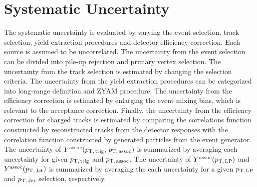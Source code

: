 
\section{Systematic Uncertainty}
\label{sec:uncertainties}
The systematic uncertainty is evaluated by varying the event selection, track selection, yield extraction procedures and detector efficiency correction. Each source is assumed to be uncorrelated. The uncertainty from the event selection can be divided into pile-up rejection and primary vertex selection. The uncertainty from the track selection is estimated by changing the selection criteria. The uncertainty from the yield extraction procedures can be categorized into long-range definition and ZYAM procedure. The uncertainty from the efficiency correction is estimated by enlarging the event mixing bins, which is relevant to the acceptance correction.
Finally, the uncertainty from the efficiency correction for charged tracks is estimated by comparing the correlations function constructed by reconstructed tracks from the detector responses with the correlation function constructed by generated particles from the event generator.
The uncertainty of $Y^{\rm{assoc}}(p_\mathrm{T,\,trig},\,p_\mathrm{T,\,assoc})$ is summarized by averaging each uncertainty for given $p_\mathrm{T,\,trig}$ and $p_\mathrm{T,\,assoc}$. The uncertainty of $Y^{\rm{assoc}}(p_\mathrm{T,\,LP})$ and $Y^{\rm{assoc}}(p_\mathrm{T,\,Jet})$ is summarized by averaging the each uncertainty for a given $p_\mathrm{T,\,LP}$ and $p_\mathrm{T,\,Jet}$ selection, respectively.
